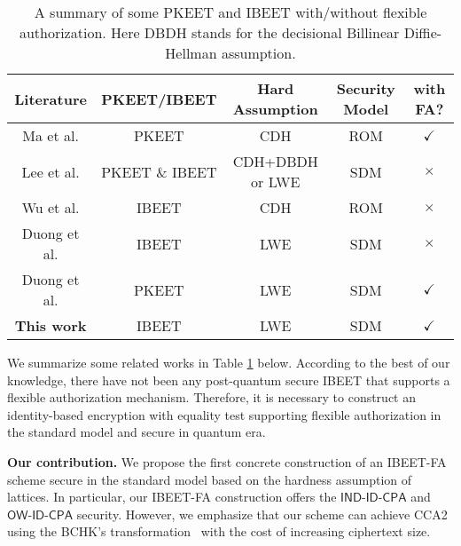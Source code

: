 \documentclass[runningheads,10pt]{llncs}
\def\OW{\textsf{OW-ID-CPA}}
\def\IND{\textsf{IND-ID-CPA}}
\begin{document}
\begin{table}[h]
	\centering
	\caption{ A summary of some PKEET  and IBEET with/without flexible authorization.  Here DBDH stands for the decisional
		Billinear Diffie-Hellman assumption. }
	\label{tab2}
	\small\addtolength{\tabcolsep}{0pt}
	\begin{tabular}{ c | c| c|c|c}
		\hline
		\textbf{Literature}& \textbf{PKEET/IBEET}&\textbf{Hard Assumption}&\textbf{Security Model}&\textbf{with FA? }\\
		\hline
		Ma et al. \cite{PKEET-FA-Maetal-16}&PKEET&CDH&ROM& $\checkmark$\\
		\hline
		Lee et al. \cite{Lee2016}&PKEET \& IBEET& \makecell{CDH+DBDH \\or LWE}&SDM&$\times$\\
		\hline	
		Wu et al. \cite{WZCH18}&IBEET&CDH&ROM&$\times$\\
		\hline	
		Duong et al. \cite{IBEET-Duong19}&IBEET&LWE&SDM&$\times$\\				\hline
		Duong et al. \cite{PKEET-FA-Duong20}&PKEET&LWE&SDM&$\checkmark$\\
		\hline
		\hline
		\textbf{This work}&IBEET&LWE&SDM&$\checkmark$\\
		\hline
	\end{tabular} 
	
\end{table}
We summarize some related works in Table \ref{tab2} below. According to the best of our knowledge, there have not been any post-quantum secure IBEET that supports a flexible authorization mechanism. Therefore, it is necessary to construct an identity-based encryption with equality test supporting flexible authorization in the standard model and secure in quantum era.

\noindent\textbf{Our contribution.}
We propose the first concrete construction of an IBEET-FA scheme secure in the standard model based on the hardness assumption of lattices. In particular, our IBEET-FA construction offers the $\IND$ and $\OW$ security. However, we emphasize that our scheme can achieve CCA2 using  the BCHK's transformation~\cite{BCHK07} with the cost of increasing ciphertext size.\\
\end{document}
